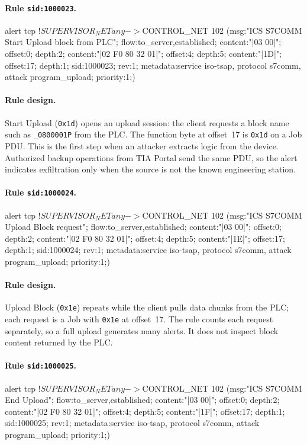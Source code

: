 \documentclass[../main.tex]{subfiles}
\begin{document}
\paragraph{Rule \texttt{sid:1000023}.}
\begin{packetdump}
alert tcp !$SUPERVISOR_NET any -> $CONTROL_NET 102 (msg:"ICS S7COMM Start Upload block from PLC";
  flow:to_server,established; content:"|03 00|"; offset:0; depth:2;
  content:"|02 F0 80 32 01|"; offset:4; depth:5; content:"|1D|";
  offset:17; depth:1; sid:1000023; rev:1;
  metadata:service iso-tsap, protocol s7comm, attack program_upload; priority:1;)
\end{packetdump}

\paragraph{Rule design.}
Start Upload (\texttt{0x1d}) opens an upload session: the client requests a block name such as \texttt{\_0800001P} from the PLC. The function byte at offset~17 is \texttt{0x1d} on a Job PDU. This is the first step when an attacker extracts logic from the device. Authorized backup operations from TIA Portal send the same PDU, so the alert indicates exfiltration only when the source is not the known engineering station.

\paragraph{Rule \texttt{sid:1000024}.}
\begin{packetdump}
alert tcp !$SUPERVISOR_NET any -> $CONTROL_NET 102 (msg:"ICS S7COMM Upload Block request";
  flow:to_server,established; content:"|03 00|"; offset:0; depth:2;
  content:"|02 F0 80 32 01|"; offset:4; depth:5; content:"|1E|";
  offset:17; depth:1; sid:1000024; rev:1;
  metadata:service iso-tsap, protocol s7comm, attack program_upload; priority:1;)
\end{packetdump}

\paragraph{Rule design.}
Upload Block (\texttt{0x1e}) repeats while the client pulls data chunks from the PLC; each request is a Job with \texttt{0x1e} at offset~17. The rule counts each request separately, so a full upload generates many alerts. It does not inspect block content returned by the PLC.

\paragraph{Rule \texttt{sid:1000025}.}
\begin{packetdump}
alert tcp !$SUPERVISOR_NET any -> $CONTROL_NET 102 (msg:"ICS S7COMM End Upload";
  flow:to_server,established; content:"|03 00|"; offset:0; depth:2;
  content:"|02 F0 80 32 01|"; offset:4; depth:5; content:"|1F|";
  offset:17; depth:1; sid:1000025; rev:1;
  metadata:service iso-tsap, protocol s7comm, attack program_upload; priority:1;)
\end{packetdump}
\end{document}
